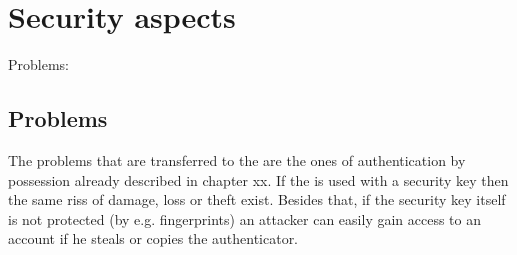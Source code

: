 \section{Security aspects}

Problems: \cite{paragon-webauth}

\subsection{Problems}

The problems that are transferred to the \wa{} are the ones of authentication by possession already described in chapter xx. If the \wa{} is used with a security key then the same riss of damage, loss or theft exist. Besides that, if the security key itself is not protected (by e.g. fingerprints) an attacker can easily gain access to an account if he steals or copies the authenticator.
